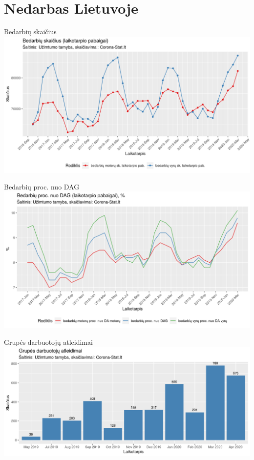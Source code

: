 \documentclass[11pt]{beamer}
\begin{document}
\section{Nedarbas Lietuvoje}

\begin{frame}{Bedarbių skaičius}
\includegraphics[scale=0.5]{bedarbiu_sk.png}
\end{frame}

\begin{frame}{Bedarbių proc. nuo DAG}
\includegraphics[scale=0.5]{bedarbiu_proc.png}
\end{frame}


\begin{frame}{Grupės darbuotojų atleidimai}
\includegraphics[scale=0.5]{grupes_darbuotoju_atleidimai_men_sum.png}
\end{frame}
\end{document}
